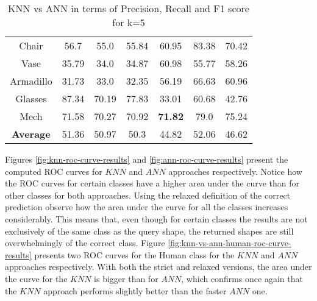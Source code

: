 \begin{table}[H]
\begin{tabular}{c|c|c|c|c|c|c}
        Chair & 56.7 & 55.0 & 55.84 & 60.95 & 83.38 & 70.42 \\ 
        Vase & 35.79 & 34.0 & 34.87 & 60.98 & 55.77 & 58.26 \\ 
        Armadillo & 31.73 & 33.0 & 32.35 & 56.19 & 66.63 & 60.96 \\ 
        Glasses & 87.34 & 70.19 & 77.83 & 33.01 & 60.68 & 42.76 \\ 
        Mech & 71.58 & 70.27 & 70.92 & \textbf{71.82} & 79.0 & 75.24 \\ 
        \hline
        \textbf{Average} & 51.36 & 50.97 & 50.3 & 44.82 & 52.06 & 46.62\\
    \end{tabular}
    \caption{KNN vs ANN in terms of Precision, Recall and F1 score for k=5}
    \label{tab:precision-recall-f1-k-5}
\end{table}

Figures \ref{fig:knn-roc-curve-results} and \ref{fig:ann-roc-curve-results} present the computed ROC curves for $KNN$ and $ANN$ approaches respectively.
Notice how the ROC curves for certain classes have a higher area under the curve than for other classes for both approaches.
Using the relaxed definition of the correct prediction observe how the area under the curve for all the classes increases considerably.
This means that, even though for certain classes the results are not exclusively of the same class as the query shape, the returned shapes are still overwhelmingly of the correct class.
Figure \ref{fig:knn-vs-ann-human-roc-curve-results} presents two ROC curves for the Human class for the $KNN$ and $ANN$ approaches respectively.
With both the strict and relaxed versions, the area under the curve for the $KNN$ is bigger than for $ANN$, which confirms once again that the $KNN$ approach performs slightly better than the faster $ANN$ one.